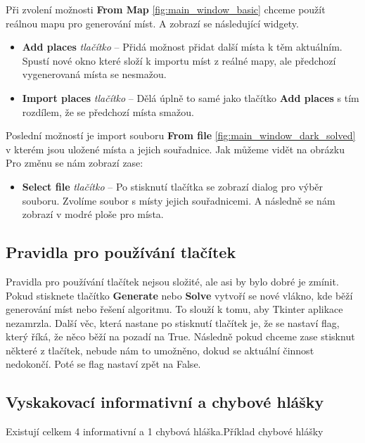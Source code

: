 Při zvolení možnosti \textbf{From Map} \ref{fig:main_window_basic} chceme použít reálnou mapu pro generování míst. A zobrazí se následující widgety. 
\begin{itemize}
\item \textbf{Add places} \textit{tlačítko} -- Přidá možnost přidat další místa k těm aktuálním. Spustí nové okno které složí k importu míst z reálné mapy, ale předchozí vygenerovaná místa se nesmažou. 
\item \textbf{Import places} \textit{tlačítko} -- Dělá úplně to samé jako tlačítko \textbf{Add places} s tím rozdílem, že se předchozí místa smažou.
\end{itemize}
Poslední možností je import souboru \textbf{From file} \ref{fig:main_window_dark_solved} v kterém jsou uložené místa a jejich souřadnice. Jak můžeme vidět na obrázku  Pro změnu se nám zobrazí zase: 
\begin{itemize}
\item \textbf{Select file} \textit{tlačítko} -- Po stisknutí tlačítka se zobrazí dialog pro výběr souboru. Zvolíme soubor s místy jejich souřadnicemi. A následně se nám zobrazí v modré ploše pro místa. 
\end{itemize}


\subsection{Pravidla pro používání tlačítek}
Pravidla pro používání tlačítek nejsou složité, ale asi by bylo dobré je zmínit. Pokud stisknete tlačítko \textbf{Generate} nebo \textbf{Solve} vytvoří se nové vlákno, kde běží generování míst nebo řešení algoritmu. To slouží k tomu, aby Tkinter aplikace nezamrzla. Další věc, která nastane po stisknutí tlačítek je, že se nastaví flag, který říká, že něco běží na pozadí na True. Následně pokud chceme zase stisknut některé z tlačítek, nebude nám to umožněno, dokud se aktuální činnost nedokončí. Poté se flag nastaví zpět na False. 

\subsection{Vyskakovací informativní a chybové hlášky}
Existují celkem 4 informativní a 1 chybová hláška.Příklad chybové hlášky 


